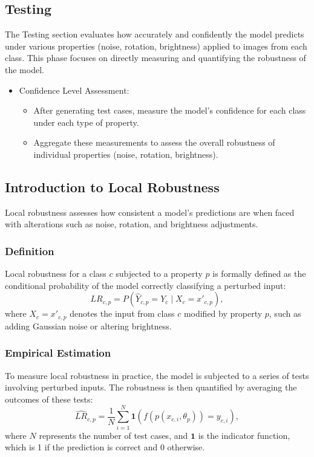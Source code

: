 \documentclass[10pt, conference, a4paper, final]{IEEEtran}
\begin{document}
\subsection{Testing }

The Testing section evaluates how accurately and confidently the model predicts under various properties (noise, rotation, brightness) applied to images from each class. This phase focuses on directly measuring and quantifying the robustness of the model.
\begin{itemize}

    \item Confidence Level Assessment:
        \begin{itemize}
            \item After generating test cases, measure the model’s confidence for each class under each type of property.
            \item Aggregate these measurements to assess the overall robustness of individual properties (noise, rotation, brightness).
        \end{itemize}

    \end{itemize}


    \subsection{Introduction to Local Robustness}
    Local robustness  assesses how consistent a model's predictions are when faced with alterations such as noise, rotation, and brightness adjustments. 
    \subsubsection{Definition}
    Local robustness for a class \(c\) subjected to a property \(p\) is formally defined as the conditional probability of the model correctly classifying a perturbed input:
    \begin{equation}
        LR_{c,p} = P(\hat{Y}_{c,p} = Y_c \mid X_c = x'_{c,p}),
    \end{equation}
    where \(X_c = x'_{c,p}\) denotes the input from class \(c\) modified by property \(p\), such as adding Gaussian noise or altering brightness.
    
    
    \subsubsection{Empirical Estimation}
    To measure local robustness in practice, the model is subjected to a series of tests involving perturbed inputs. The robustness is then quantified by averaging the outcomes of these tests:
    \begin{equation}
        \hat{LR}_{c,p} = \frac{1}{N} \sum_{i=1}^N \mathbf{1}(f(p(x_{c,i}, \theta_p)) = y_{c,i}),
    \end{equation}
    where \(N\) represents the number of test cases, and \(\mathbf{1}\) is the indicator function, which is 1 if the prediction is correct and 0 otherwise. 
\end{document}
